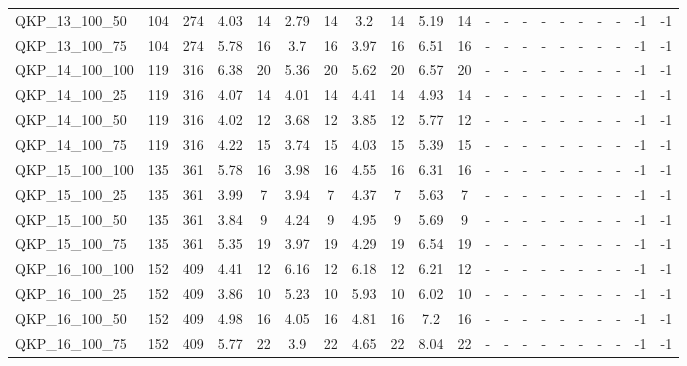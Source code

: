 \begin{sidewaystable}[!ht]
{\begin{tabular}{lcccccccccccccccccccc}
QKP\_13\_100\_50 & 104 & 274 & 4.03 & 14 &  \textcolor{blue2}{2.79} & 14 & 3.2 & 14 & 5.19 & 14 &  - &  - &  - &  - &  - &  - &  - &  - & -1 & -1 \\
QKP\_13\_100\_75 & 104 & 274 & 5.78 & 16 &  \textcolor{blue2}{3.7} & 16 & 3.97 & 16 & 6.51 & 16 &  - &  - &  - &  - &  - &  - &  - &  - & -1 & -1 \\
QKP\_14\_100\_100 & 119 & 316 & 6.38 & 20 &  \textcolor{blue2}{5.36} & 20 & 5.62 & 20 & 6.57 & 20 &  - &  - &  - &  - &  - &  - &  - &  - & -1 & -1 \\
QKP\_14\_100\_25 & 119 & 316 & 4.07 & 14 &  \textcolor{blue2}{4.01} & 14 & 4.41 & 14 & 4.93 & 14 &  - &  - &  - &  - &  - &  - &  - &  - & -1 & -1 \\
QKP\_14\_100\_50 & 119 & 316 & 4.02 & 12 &  \textcolor{blue2}{3.68} & 12 & 3.85 & 12 & 5.77 & 12 &  - &  - &  - &  - &  - &  - &  - &  - & -1 & -1 \\
QKP\_14\_100\_75 & 119 & 316 & 4.22 & 15 &  \textcolor{blue2}{3.74} & 15 & 4.03 & 15 & 5.39 & 15 &  - &  - &  - &  - &  - &  - &  - &  - & -1 & -1 \\
QKP\_15\_100\_100 & 135 & 361 & 5.78 & 16 &  \textcolor{blue2}{3.98} & 16 & 4.55 & 16 & 6.31 & 16 &  - &  - &  - &  - &  - &  - &  - &  - & -1 & -1 \\
QKP\_15\_100\_25 & 135 & 361 & 3.99 & 7 &  \textcolor{blue2}{3.94} & 7 & 4.37 & 7 & 5.63 & 7 &  - &  - &  - &  - &  - &  - &  - &  - & -1 & -1 \\
QKP\_15\_100\_50 & 135 & 361 &  \textcolor{blue2}{3.84} & 9 & 4.24 & 9 & 4.95 & 9 & 5.69 & 9 &  - &  - &  - &  - &  - &  - &  - &  - & -1 & -1 \\
QKP\_15\_100\_75 & 135 & 361 & 5.35 & 19 &  \textcolor{blue2}{3.97} & 19 & 4.29 & 19 & 6.54 & 19 &  - &  - &  - &  - &  - &  - &  - &  - & -1 & -1 \\
QKP\_16\_100\_100 & 152 & 409 &  \textcolor{blue2}{4.41} & 12 & 6.16 & 12 & 6.18 & 12 & 6.21 & 12 &  - &  - &  - &  - &  - &  - &  - &  - & -1 & -1 \\
QKP\_16\_100\_25 & 152 & 409 &  \textcolor{blue2}{3.86} & 10 & 5.23 & 10 & 5.93 & 10 & 6.02 & 10 &  - &  - &  - &  - &  - &  - &  - &  - & -1 & -1 \\
QKP\_16\_100\_50 & 152 & 409 & 4.98 & 16 &  \textcolor{blue2}{4.05} & 16 & 4.81 & 16 & 7.2 & 16 &  - &  - &  - &  - &  - &  - &  - &  - & -1 & -1 \\
QKP\_16\_100\_75 & 152 & 409 & 5.77 & 22 &  \textcolor{blue2}{3.9} & 22 & 4.65 & 22 & 8.04 & 22 &  - &  - &  - &  - &  - &  - &  - &  - & -1 & -1 \\

\end{tabular}}
\end{sidewaystable}
